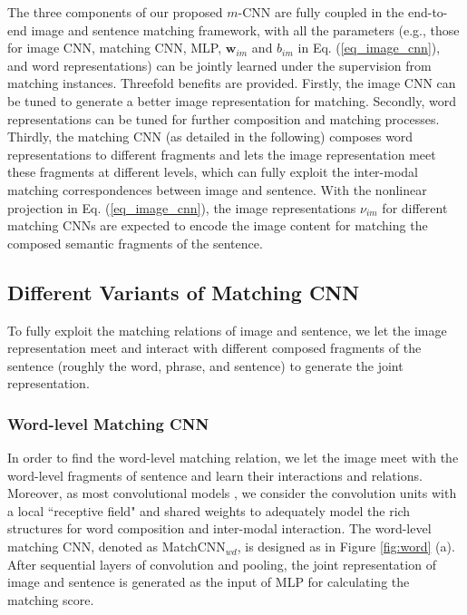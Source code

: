 \documentclass[10pt,twocolumn,letterpaper]{article}
\begin{document}
\begin{itemize}
\end{itemize}

The three components of our proposed $m$-CNN are fully coupled in the end-to-end image and sentence matching framework, with all the parameters (e.g., those for image CNN, matching CNN, MLP, $\mathbf{w}_{im}$ and $b_{im}$ in Eq. (\ref{eq_image_cnn}), and word representations) can be jointly learned under the supervision from matching instances. Threefold benefits are provided. Firstly, the image CNN can be tuned to generate a better image representation for matching. Secondly, word representations can be tuned for further composition and matching processes.  Thirdly, the matching CNN (as detailed in the following) composes word representations to different fragments and lets the image representation meet these fragments at different levels, which can fully exploit the inter-modal matching correspondences between image and sentence. With the nonlinear projection in Eq. (\ref{eq_image_cnn}), the image representations $\nu_{im}$ for different matching CNNs are expected to encode the image content for matching the composed semantic fragments of the sentence.



\subsection{Different Variants of Matching CNN}
\label{sec:matchingCNN}


To fully exploit the matching relations of image and sentence, we let the image representation meet and interact with different composed fragments of the sentence (roughly the word, phrase, and sentence) to generate the joint representation.


\subsubsection{Word-level Matching CNN}


In order to find the word-level matching relation, we let the image meet with the word-level fragments of sentence and learn their interactions and relations. Moreover, as most convolutional models \cite{ cnn_speech,cnn_image}, we consider the convolution units with a local ``receptive field" and shared weights to adequately model the rich structures for word composition and inter-modal interaction. The word-level matching CNN, denoted as MatchCNN$_{wd}$, is designed as in Figure \ref{fig:word} (a). After sequential layers of convolution and pooling, the joint representation of image and sentence is generated as the input of MLP for calculating the matching score.
\end{document}
